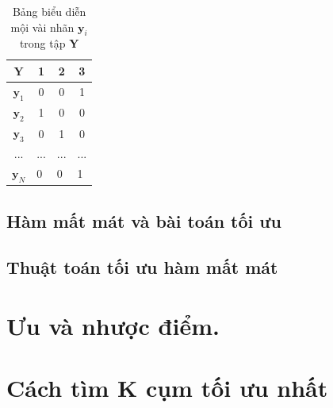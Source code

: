 \documentclass{article}
\begin{document}
\begin{table}[h]
\centering
\begin{tabular}{|c|c|c|c|}
\hline
$\mathbf{Y}$                           & 1                      & 2                       & 3                       \\ \hline
$\mathbf{y}_1$                         & 0                      & 0                       & 1                       \\ \hline
$\mathbf{y}_2$                         & 1                      & 0                       & 0                       \\ \hline
$\mathbf{y}_3$                         & 0                      & 1                       & 0                       \\ \hline
...                                    & ...                    & ...                     & ...                     \\ \hline
\multicolumn{1}{|l|}{$\mathbf{y}_N$}   & \multicolumn{1}{l|}{0} & \multicolumn{1}{l|}{0}  & \multicolumn{1}{l|}{1}  \\ \hline
\end{tabular}
\caption{Bảng biểu diễn mội vài nhãn $\mathbf{y}_i$ trong tập $\mathbf{Y}$}
\label{tab:tbexample}
\end{table}

\newpage
\subsection{Hàm mất mát và bài toán tối ưu} %
\label{sub:hàm_mất_mát_và_bài_toán_tối_ưu}

\subsection{Thuật toán tối ưu hàm mất mát} %
\label{sub:thuật_toán_tối_ưu_hàm_mất_mát}

\newpage
\section{Ưu và nhược điểm.} %
\label{sec:ưu_và_nhược_điểm_}

\newpage
\section{Cách tìm K cụm tối ưu nhất}

\end{document}
